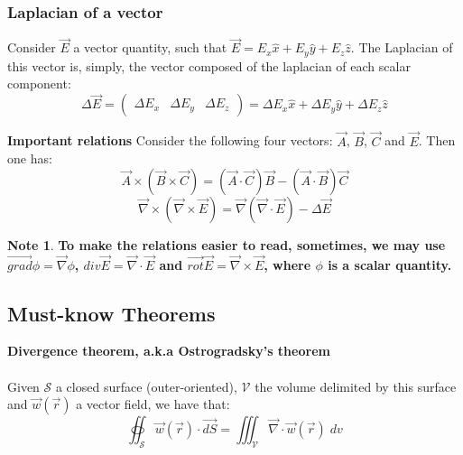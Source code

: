 \documentclass[11pt]{article}
\theoremstyle{definition}
\newtheorem{note}{Note}
\begin{document}
\subsubsection{Laplacian of a vector}
Consider $\vec{E}$ a vector quantity, such that $\vec{E} = E_{x}\hat{x}+E_{y}\hat{y}+E_{z}\hat{z}$. The Laplacian of this vector is, simply, the vector composed of the laplacian of each scalar component:
\begin{equation}
    \Delta \vec{E} = \left(\begin{matrix}
                        \Delta E_{x} & \Delta E_{y} & \Delta E_{z}
                     \end{matrix}\right) = \Delta E_{x}\hat{x} + \Delta E_{y}\hat{y} + \Delta E_{z}\hat{z}
\end{equation}
\begin{shaded}
\textbf{Important relations}\newline
Consider the following four vectors: $\vec{A}$, $\vec{B}$, $\vec{C}$ and $\vec{E}$. Then one has:
\begin{equation}
\vec{A} \times \left(\vec{B} \times \vec{C}\right) = \left(\vec{A} \cdot \vec{C}\right)\vec{B} - \left(\vec{A} \cdot \vec{B}\right)\vec{C}
\end{equation}
\begin{equation}
\vec{\nabla} \times \left(\vec{\nabla} \times \vec{E}\right) = \vec{\nabla}\left(\vec{\nabla} \cdot \vec{E}\right) - \Delta \vec{E}
\end{equation}
\begin{note}
\textbf{To make the relations easier to read, sometimes, we may use $\vec{grad} \phi = \vec{\nabla}\phi$, $div \vec{E}= \vec{\nabla} \cdot \vec{E}$ and $\vec{rot} \vec{E}= \vec{\nabla} \times \vec{E}$, where $\phi$ is a scalar quantity.}
\end{note}
\end{shaded}
\subsection{Must-know Theorems}
\begin{shaded}
    \textbf{Divergence theorem, a.k.a Ostrogradsky's theorem}\\
    \\
    Given $\mathcal{S}$ a closed surface (outer-oriented), $\mathcal{V}$ the volume delimited by this surface and $\vec{w}\left(\vec{r}\right)$ a vector field, we have that:
    \begin{equation}
        \oiint_{\mathcal{S}} \vec{w}\left(\vec{r}\right) \cdot \vec{dS} = \iiint_{\mathcal{V}}\vec{\nabla} \cdot \vec{w}\left(\vec{r}\right) \; dv
    \end{equation}
\end{shaded}
\end{document}
